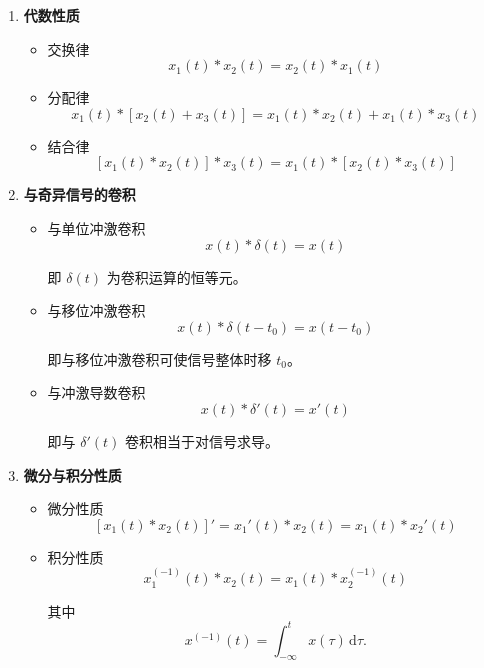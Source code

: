 \documentclass[UTF8,fontset=fandol,zihao=5]{ctexart}
\newcommand{\dd}{\,\mathrm{d}}
\begin{document}
\begin{enumerate}
\begin{methodbox}[卷积性质]
\begin{enumerate}[label=\arabic*.]
      \item \textbf{代数性质}

      \begin{itemize}
        \item 交换律
        \[
        x_1(t)\ast x_2(t)
        =
        x_2(t)\ast x_1(t)
        \]

        \item 分配律
        \[
        x_1(t)\ast \left[x_2(t)+x_3(t)\right]
        =
        x_1(t)\ast x_2(t)
        +
        x_1(t)\ast x_3(t)
        \]

        \item 结合律
        \[
        \left[x_1(t)\ast x_2(t)\right]\ast x_3(t)
        =
        x_1(t)\ast\left[x_2(t)\ast x_3(t)\right]
        \]

      \end{itemize}

      \item \textbf{与奇异信号的卷积}

      \begin{itemize}
        \item 与单位冲激卷积
        \[
        x(t)\ast\delta(t)=x(t)
        \]

        即 $\delta(t)$ 为卷积运算的恒等元。

        \item 与移位冲激卷积
        \[
        x(t)\ast\delta(t-t_0)
        =
        x(t-t_0)
        \]

        即与移位冲激卷积可使信号整体时移 $t_0$。

        \item 与冲激导数卷积
        \[
        x(t)\ast\delta'(t)
        =
        x'(t)
        \]

        即与 $\delta'(t)$ 卷积相当于对信号求导。
      \end{itemize}

      \item \textbf{微分与积分性质}

      \begin{itemize}
        \item 微分性质
        \[
        \left[x_1(t)\ast x_2(t)\right]'
        =
        x_1'(t)\ast x_2(t)
        =
        x_1(t)\ast x_2'(t)
        \]

        \item 积分性质
        \[
        x_1^{(-1)}(t)\ast x_2(t)
        =
        x_1(t)\ast x_2^{(-1)}(t)
        \]

        其中
        \[
        x^{(-1)}(t)
        =
        \int_{-\infty}^{t}x(\tau)\dd\tau.
        \]


\end{itemize}
\end{enumerate}
\end{methodbox}
\end{enumerate}
\end{document}
